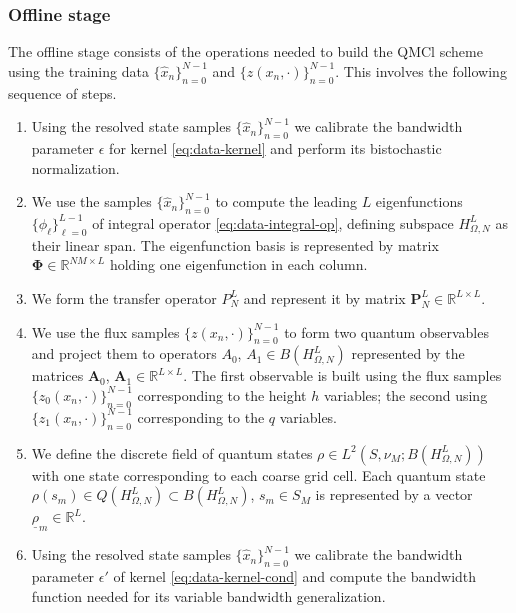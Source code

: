 \documentclass[letterpaper,10pt,3p,preprint]{elsarticle}
\newcommand{\Rbb}{\mathbb{R}}
\newcommand{\vect}[1]{\underline{#1}}
\newcommand{\matr}[1]{\bm{#1}}
\begin{document}
\subsubsection*{Offline stage}
The offline stage consists of the operations needed to build the
QMCl scheme using the training data
$\{\hat{x}_n\}_{n=0}^{N-1}$ and
$\{z(x_n,\cdot)\}_{n=0}^{N-1}$.
This involves the following sequence of steps.
\begin{enumerate}
\item Using the resolved state samples $\{\hat{x}_n\}_{n=0}^{N-1}$
we calibrate the bandwidth parameter $\epsilon$
for kernel \eqref{eq:data-kernel}
and perform its bistochastic normalization.
\item We use the samples $\{\hat{x}_n\}_{n=0}^{N-1}$
to compute the leading $L$ eigenfunctions
$\{\phi_\ell\}_{\ell=0}^{L-1}$
of integral operator
\eqref{eq:data-integral-op},
defining subspace $H_{\Omega,N}^L$ as their linear span.
The eigenfunction basis is represented by matrix
$\matr{\Phi}\in\Rbb^{NM\times L}$
holding one eigenfunction in each column.
\item We form the transfer operator $P_N^L$
and represent it by matrix
$\matr{P}_N^L\in\Rbb^{L\times L}$.
\item We use the flux samples $\{z(x_n,\cdot)\}_{n=0}^{N-1}$
to form two quantum observables and project them to operators
$A_0$, $A_1\in B(H_{\Omega,N}^L)$
represented by the matrices
$\matr{A}_0$, $\matr{A}_1\in\Rbb^{L\times L}$.
The first observable is built using the flux samples
$\{z_0(x_n,\cdot)\}_{n=0}^{N-1}$
corresponding to the height $h$ variables;
the second using
$\{z_1(x_n,\cdot)\}_{n=0}^{N-1}$
corresponding to the $q$ variables.
\item We define the discrete field of quantum states
$\rho\in L^2(S,\nu_M; B(H_{\Omega,N}^L))$
with one state corresponding to each coarse grid cell.
Each quantum state
$\rho(s_m)\in Q(H_{\Omega,N}^L)\subset B(H_{\Omega,N}^L)$,
$s_m\in S_M$
is represented by a vector $\vect{\rho}_m\in\Rbb^L$.
\item Using the resolved state samples $\{\hat{x}_n\}_{n=0}^{N-1}$
we calibrate the bandwidth parameter $\epsilon'$
of kernel \eqref{eq:data-kernel-cond}
and compute the bandwidth function needed for its variable
bandwidth generalization.
\end{enumerate}
\end{document}
